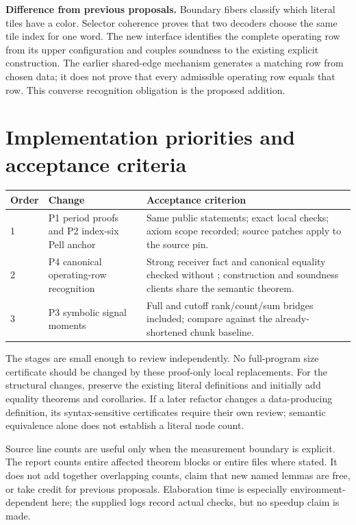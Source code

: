 \documentclass[11pt]{article}
\newcommand{\code}[1]{\texttt{\detokenize{#1}}}
\begin{document}
\RowsResults

\textbf{Difference from previous proposals.} Boundary fibers classify which literal tiles have a color. Selector coherence proves that two decoders choose the same tile index for one word. The new interface identifies the complete operating row from its upper configuration and couples soundness to the existing explicit construction. The earlier shared-edge mechanism generates a matching row from chosen data; it does not prove that every admissible operating row equals that row. This converse recognition obligation is the proposed addition.

\section{Implementation priorities and acceptance criteria}

\begin{center}\small
\begin{tabularx}{\textwidth}{@{}p{}Y>{\raggedright\arraybackslash}p{0.33\textwidth}@{}}\toprule
Order & Change & Acceptance criterion\\ & P1 period proofs and P2 index-six Pell anchor & Same public statements; exact local checks; axiom scope recorded; source patches apply to the source pin.\\
2 & P4 canonical operating-row recognition & Strong receiver fact and canonical equality checked without \code{south_step}; construction and soundness clients share the semantic theorem.\\
3 & P3 symbolic signal moments & Full and cutoff rank/count/sum bridges included; compare against the already-shortened chunk baseline.\\\bottomrule
\end{tabularx}
\end{center}

The stages are small enough to review independently. No full-program size certificate should be changed by these proof-only local replacements. For the structural changes, preserve the existing literal definitions and initially add equality theorems and corollaries. If a later refactor changes a data-producing definition, its syntax-sensitive certificates require their own review; semantic equivalence alone does not establish a literal node count.

Source line counts are useful only when the measurement boundary is explicit. The report counts entire affected theorem blocks or entire files where stated. It does not add together overlapping counts, claim that new named lemmas are free, or take credit for previous proposals. Elaboration time is especially environment-dependent here; the supplied logs record actual checks, but no speedup claim is made.
\end{document}
